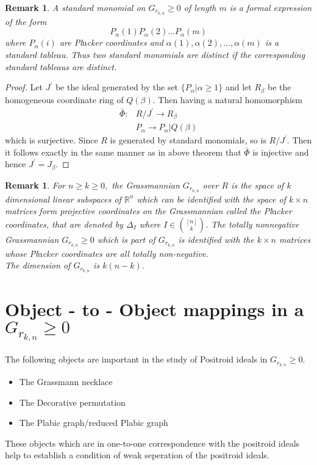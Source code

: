 \documentclass[12pt]{report}
\theoremstyle{theorem}
\newtheorem{remark}[theorem]{Remark}
\begin{document}
\begin{remark}
\normalfont A standard monomial on $G_{r_{k,n}}\geq 0$ of length $m$ is a formal expression of the form
$$
P_{\alpha}(1)P_{\alpha}(2)\ldots P_{\alpha}(m)
$$
where $P_{\alpha}(i)$ are Pl$\ddot{\mbox{u}}$cker coordinates and $\alpha(1),\alpha(2),\ldots,\alpha(m)$ is a standard tableau. Thus two standard monomials are distinct if the corresponding standard tableaus are distinct.
\end{remark}
\begin{proof}
Let $J^\prime$ be the ideal generated by the set $\{P_\alpha| \alpha\geq1\}$ and let $R_\beta$ be the homogeneous coordinate ring of $Q(\beta)$. Then having a natural homomorphism
\begin{align*}
\bar{\Phi}: & R/J^\prime \longrightarrow R_\beta\\
& P_\alpha\longrightarrow P_\alpha|Q(\beta)
\end{align*}
which is surjective.
Since $R$ is generated by standard monomials, so is $R/J^\prime$. Then it follows exactly in the same manner as in above theorem that $\bar{\Phi}$ is injective and hence $J^\prime = J_\beta$.
\end{proof}
\begin{remark}
\normalfont For $n\geq k\geq 0,$ the Grassmannian $G_{r_{k,n}}$ over $R$ is the space of $k$ dimensional linear subspaces of $\mathbb{R}^n$ which can be identified with the space of $k\times n$ matrices form projective coordinates on the Grassmannian called the Pl$\ddot{\mbox{u}}$cker coordinates, that are denoted by $\Delta_{I}$ where $I\in\binom{[n]}{k}$.
The totally nonnegative Grassmannian $G_{r_{k,n}}\geq 0$ which is part of $G_{r_{k,n}}$ is identified with the $k\times n$ matrices whose Pl$\ddot{\mbox{u}}$cker coordinates are all totally non-negative.\\
The dimension of $G_{r_{k,n}}$ is $k(n-k).$
\end{remark}
\section*{Object - to - Object mappings in a $G_{r_{k,n}}\geq 0$}

The following objects are important in the study of Positroid ideals in $G_{r_{k,n}}\geq 0$.
\begin{itemize}
\item The Grassmann necklace
\item The Decorative permutation
\item The Plabic graph/reduced  Plabic graph
\end{itemize}
These objects which  are in one-to-one correspondence with the positroid ideals help to establish a condition of weak seperation of the positroid ideals.
\end{document}
